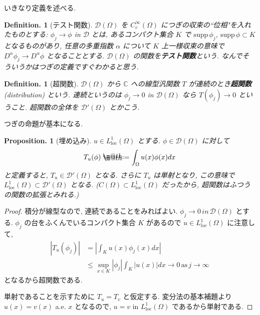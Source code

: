 \documentclass[openany, a4paper, oneside]{jsbook}
\makeatletter
\newcommand*{\defeq}{\mathrel{\rlap{%
\raisebox{0.3ex}{$\m@th\cdot$}}%
\raisebox{-0.3ex}{$\m@th\cdot$}}%
=}
\theoremstyle{break}
\theoremstyle{breakdefn}
\newtheorem{prop}[thm]{Proposition.}
\newtheorem{defn}[thm]{Definition.}
\newcommand{\abs}[1]{\left|#1\right|}
\newcommand{\Loneloc}{L_{\mathrm{loc}}^1}
\newcommand{\supp}{\mathrm{supp} \,}
\makeatother
\begin{document}
いきなり定義を述べる.
\begin{defn}[テスト関数]
 $\mathcal{D}(\Omega)$ を $C_c^{\infty}(\Omega)$ につぎの収束の``位相"を入れたものとする:
 $\phi_j \to \phi$ in $\mathcal{D}$ とは,
 あるコンパクト集合 $K$ で $\supp \phi_j$, $\supp  \phi \subset K$ となるものがあり,
 任意の多重指数 $\alpha$ について $K$ 上一様収束の意味で $D^{\alpha}\phi_j \to D^{\alpha}\phi$ となることとする.
 $\mathcal{D}(\Omega)$ の関数を\textbf{テスト関数}という.
 なんでそういうかはつぎの定義ですぐわかると思う.
\end{defn}
\begin{defn}[超関数]
 $\mathcal{D}(\Omega)$ から $\mathbb{C}$ への線型汎関数
 $T$ が連続のとき\textbf{超関数}(distribution) という.
 連続というのは $\phi_j \to  0$ in $\mathcal{D}(\Omega)$ なら
 $T (\phi_j) \to 0$ ということ.
 超関数の全体を $\mathcal{D}'(\Omega)$ とかこう.
\end{defn}
つぎの命題が基本になる.
\begin{prop}[埋め込み]
 $u \in \Loneloc (\Omega)$ とする.
 $\phi \in \mathcal{D}(\Omega)$ に対して
 \begin{equation}
  T_u (\phi)
  \defeq
  \int_{\Omega}u (x)\phi (x) dx
 \end{equation}
 と定義すると, $T_u \in \mathcal{D}'(\Omega)$ となる.
 さらに $T_u$ は単射となり, この意味で $\Loneloc (\Omega) \subset \mathcal{D}'(\Omega)$ となる.
 ($C (\Omega) \subset \Loneloc (\Omega)$ だったから, 超関数はふつうの関数の拡張とみれる.)
\end{prop}
\begin{proof}
積分が線型なので, 連続であることをみればよい.
$\phi_j \to 0 \, in \, \mathcal{D}(\Omega)$ とする.
$\phi_j$ の台をふくんでいるコンパクト集合 $K$ があるので $u \in L_{loc}^1 (\Omega)$ に注意して,
\begin{equation}
 \begin{split}
  \abs{T_u (\phi_j)}
  &=
  \abs{\int_K u (x)\phi_j (x) dx} \\
  &\le
  \sup_{x \in K} \abs{\phi_j} \int_K \abs{u(x)} dx \to 0 \, \mathrm{as} \, j \to \infty
 \end{split}
\end{equation}
となるから超関数である.

単射であることを示すために $T_u = T_v$ と仮定する.
変分法の基本補題より $u (x ) = v (x)$ a.e. $x$ となるので,
$u = v$ in $\Loneloc (\Omega)$ であるから単射である.
\end{proof}
\end{document}
